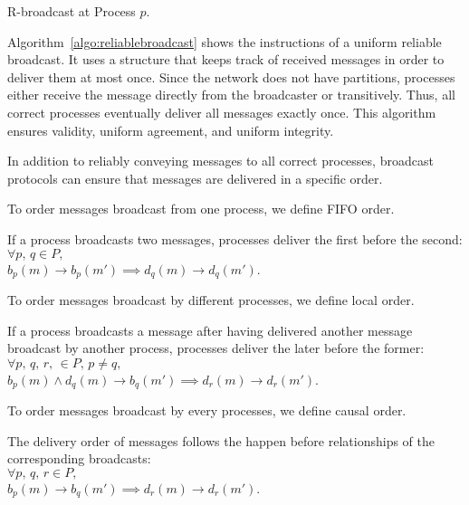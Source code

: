 \begin{algorithm}[h]
  
  \caption{\label{algo:reliablebroadcast}R-broadcast at Process $p$.}
\end{algorithm}

Algorithm~\ref{algo:reliablebroadcast} shows the instructions of a uniform
reliable broadcast. It uses a structure that keeps track of received messages in
order to deliver them at most once. 
Since the network does not have partitions, processes either receive the message
directly from the broadcaster or transitively. Thus, all correct processes
eventually deliver all messages exactly once. This algorithm ensures validity,
uniform agreement, and uniform integrity.

In addition to reliably conveying messages to all correct processes, broadcast
protocols can ensure that messages are delivered in a specific order.

To order messages broadcast from one process, we define FIFO order.

\begin{definition}
  If a process broadcasts two messages, processes deliver the first before the
  second:\\
  $\forall p,\,q \in P,\,$\\$b_p(m) \rightarrow b_p(m') \implies d_q(m) \rightarrow
  d_q(m')$.
\end{definition}

To order messages broadcast by different processes, we define local order.

\begin{definition}
  If a process broadcasts a message after having delivered another message
  broadcast by another process, processes deliver the later before the former:\\
  $\forall p,\,q,\,r,\, \in P,\,p\neq q,\,$\\$b_p(m) \wedge d_q(m) \rightarrow b_q(m') \implies d_r(m) \rightarrow d_r(m')$.
\end{definition}

To order messages broadcast by every processes, we define causal order.

\begin{definition}
  The delivery order of messages follows the happen before relationships of the
  corresponding broadcasts:\\ $\forall
  p,\,q,\,r \in P,\,$\\$b_p(m) \rightarrow b_q(m') \implies d_r(m) \rightarrow d_r(m')$.
\end{definition}

